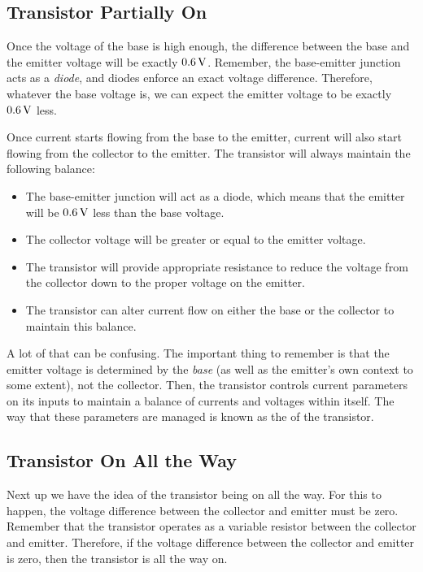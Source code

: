 \subsection{Transistor Partially On}

Once the voltage of the base is high enough, the difference between the base and the emitter voltage will be exactly $0.6\,\si{\volt}$.
Remember, the base-emitter junction acts as a \emph{diode}, and diodes enforce an exact voltage difference. 
Therefore, whatever the base voltage is, we can expect the emitter voltage to be exactly $0.6\,\si{\volt}$ less.

Once current starts flowing from the base to the emitter, current will also start flowing from the collector to the emitter.
The transistor will always maintain the following balance:
\begin{itemize}
\item The base-emitter junction will act as a diode, which means that the emitter will be $0.6\,\si{\volt}$ less than the base voltage.
\item The collector voltage will be greater or equal to the emitter voltage.
\item The transistor will provide appropriate resistance to reduce the voltage from the collector down to the proper voltage on the emitter.
\item The transistor can alter current flow on either the base or the collector to maintain this balance.
\end{itemize}

A lot of that can be confusing.
The important thing to remember is that the emitter voltage is determined by the \emph{base} (as well as the emitter's own context to some extent), not the collector.
Then, the transistor controls current parameters on its inputs to maintain a balance of currents and voltages within itself.
The way that these parameters are managed is known as the  of the transistor.

\subsection{Transistor On All the Way}

Next up we have the idea of the transistor being on all the way.
For this to happen, the voltage difference between the collector and emitter must be zero.
Remember that the transistor operates as a variable resistor between the collector and emitter.
Therefore, if the voltage difference between the collector and emitter is zero, then the transistor is all the way on.

